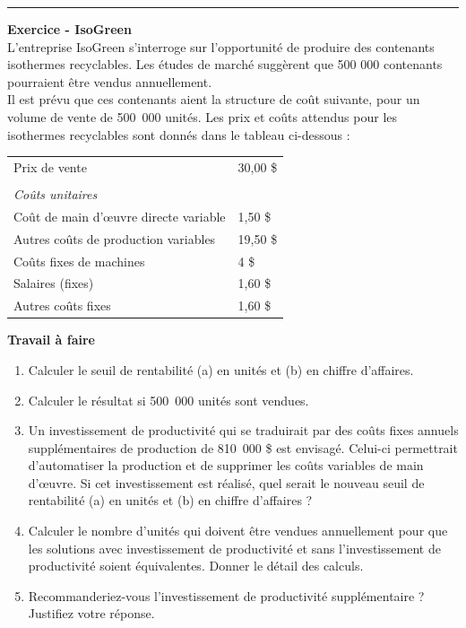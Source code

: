 \documentclass{kaobook}
\begin{document}
\noindent\rule{\textwidth}{0.5pt}
\textbf{Exercice - IsoGreen}\\
L'entreprise IsoGreen s’interroge sur l’opportunité de produire des contenants isothermes recyclables. Les études de marché suggèrent que 500 000 contenants pourraient être vendus annuellement.\\

Il est prévu que ces contenants aient la structure de coût suivante, pour un volume de vente de 500 000 unités. Les prix et coûts attendus pour les isothermes recyclables sont donnés dans le tableau ci-dessous :\\

\begin{center}
\begin{tabular}{ll}
Prix de vente & 30,00 \$\\
 & \\
\emph{Coûts unitaires} & \\
Coût de main d’œuvre directe variable & 1,50 \$\\
Autres coûts de production variables & 19,50 \$\\
Coûts fixes de machines & 4 \$\\
Salaires (fixes) & 1,60 \$\\
Autres coûts fixes & 1,60 \$\\
\end{tabular}
\end{center}

\textbf{Travail à faire}\\
\begin{enumerate}
\item Calculer le seuil de rentabilité (a) en unités et (b) en chiffre d’affaires.\\
\item Calculer le résultat si 500 000 unités sont vendues.\\
\item Un investissement de productivité qui se traduirait par des coûts fixes annuels supplémentaires de production de 810 000 \$ est envisagé. Celui-ci permettrait d’automatiser la production et de supprimer les coûts variables de main d’œuvre. Si cet investissement est réalisé, quel serait le nouveau seuil de rentabilité (a) en unités et (b) en chiffre d’affaires ?\\
\item Calculer le nombre d’unités qui doivent être vendues annuellement pour que les solutions avec investissement de productivité et sans l’investissement de productivité soient équivalentes. Donner le détail des calculs.\\
\item Recommanderiez-vous l’investissement de productivité supplémentaire ? Justifiez votre réponse.\\
\end{enumerate}
\end{document}
